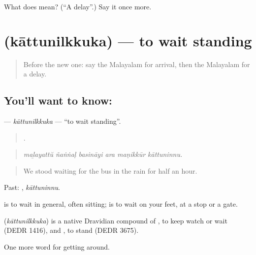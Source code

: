 \begin{tcolorbox}[breakable,colback=teal!4,colframe=teal!35!black,title={Before you move on}]
What does  mean? (\textquotedblleft{}A delay\textquotedblright{}.) Say it once more.
\end{tcolorbox}
\section[\texorpdfstring{\ml{കാത്തുനിൽക്കുക} (kāttunilkkuka)}{കാത്തുനിൽക്കുക (kāttunilkkuka)}]{ (kāttunilkkuka) — to wait standing}

\label{lesson:ML-C465-kattunilkkuka}



\begin{quote}
Before the new one: say the Malayalam for arrival, then the Malayalam for a delay.
\end{quote}

\subsection*{You'll want to know: }
\textbf{} — \emph{kāttunilkkuka} — \textquotedblleft{}to wait standing\textquotedblright{}.

\begin{quote}
     .
\end{quote}

\begin{quote}
\emph{maḻayattŭ ñaṅṅaḷ basināyi ara maṇikkūr kāttuninnu.}
\end{quote}

\begin{quote}
We stood waiting for the bus in the rain for half an hour.
\end{quote}

Past: , \emph{kāttuninnu}.

 is to wait in general, often sitting;  is to wait on your feet, at a stop or a gate.

\begin{cousinweb}
\textbf{} (\emph{kāttunilkkuka}) is a native Dravidian compound of , to keep watch or wait (DEDR 1416), and , to stand (DEDR 3675).
\end{cousinweb}

\begin{grammarlens}[title={What you've built}]
One more word for getting around.
\end{grammarlens}

